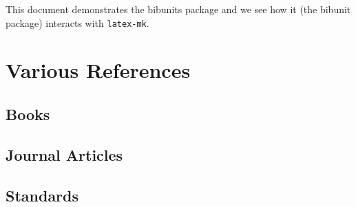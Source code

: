 \documentclass[final, letterpaper, 10pt]{article}
\begin{document}
This document demonstrates the bibunits package and we see how it
(the bibunit package) interacts with {\tt latex-mk}.

\section*{Various References}
\renewcommand{\refname}{}

\subsection*{Books}
\begin{bibunit}[IEEEtran]
  \nocite{churchill84, cover91}
\end{bibunit}

\subsection*{Journal Articles}
\begin{bibunit}[IEEEtran]
  \nocite{fano50, green54}
\end{bibunit}

\subsection*{Standards}
\begin{bibunit}[IEEEtran]
  \nocite{en300.175-2v1.4.2}
\end{bibunit}
\end{document}
